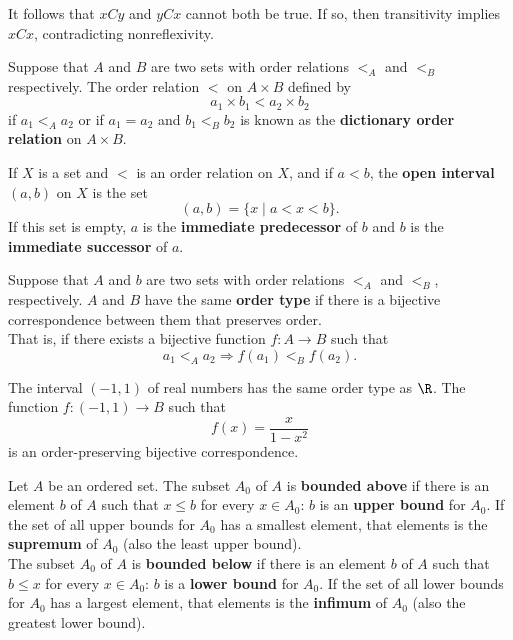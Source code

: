 \begin{remark}
It follows that $xCy$ and $yCx$ cannot both be true. If so, then transitivity implies $xCx$, contradicting nonreflexivity.    
\end{remark}

\begin{eg}
Suppose that $A$ and $B$ are two sets with order relations $<_A$ and $<_B$ respectively. The order relation $<$ on $A \times B$ defined by
\[
    a_1 \times b_1 < a_2 \times b_2
\]
if $a_1 <_A a_2$ or if $a_1 = a_2$ and $b_1 <_B b_2$ is known as the \textbf{dictionary order relation} on $A \times B$.
\end{eg}

\begin{definition}
If $X$ is a set and $<$ is an order relation on $X$, and if $a < b$, the \textbf{open interval} $(a, b)$ on $X$ is the set
\[
    (a, b) = \{ x \mid a < x < b \}. 
\] 
If this set is empty, $a$ is the \textbf{immediate predecessor} of $b$ and $b$ is the \textbf{immediate successor} of $a$.
\end{definition}

\begin{definition}
Suppose that $A$ and $b$ are two sets with order relations $<_A$ and $<_B$, respectively. $A$ and $B$ have the same \textbf{order type} 
if there is a bijective correspondence between them that preserves order. \\

That is, if there exists a bijective function $f \colon A \rightarrow B$ such that
\[
    a_1 <_A a_2 \Rightarrow f(a_1) <_B f(a_2).
\]
\end{definition}

\begin{eg}
The interval $(-1, 1)$ of real numbers has the same order type as $\R$. The function $f \colon (-1, 1) \rightarrow B$ such that
\[
    f(x) = \frac{x}{1-x^2}
\]
is an order-preserving bijective correspondence.
\end{eg}

\begin{definition}
Let $A$ be an ordered set. The subset $A_0$ of $A$ is \textbf{bounded above} if there is an element $b$ of $A$ such that $x \leq b$ for every $x \in A_0$: 
$b$ is an \textbf{upper bound} for $A_0$. 
If the set of all upper bounds for $A_0$ has a smallest element, that elements is the \textbf{supremum} of $A_0$ (also the least upper bound). \\

The subset $A_0$ of $A$ is \textbf{bounded below} if there is an element $b$ of $A$ such that $b \leq x$ for every $x \in A_0$: 
$b$ is a \textbf{lower bound} for $A_0$. 
If the set of all lower bounds for $A_0$ has a largest element, that elements is the \textbf{infimum} of $A_0$ (also the greatest lower bound). \\
\end{definition}

